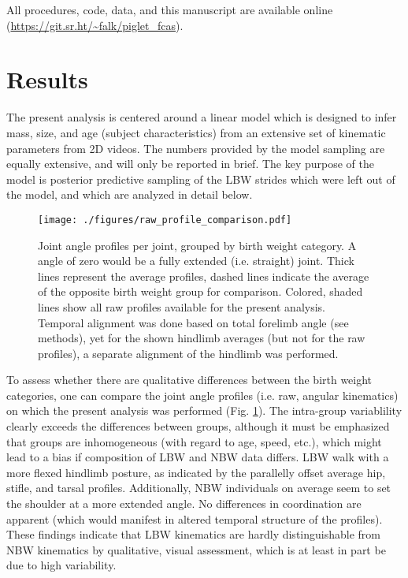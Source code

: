 All procedures, code, data, and this manuscript are available online (\url{https://git.sr.ht/\~falk/piglet\_fcas}).

\FloatBarrier
\clearpage
\section{Results}
\label{results_22}
The present analysis is centered around a linear model which is designed to infer mass, size, and age (subject characteristics) from an extensive set of kinematic parameters from 2D videos.
The numbers provided by the model sampling are equally extensive, and will only be reported in brief.
The key purpose of the model is posterior predictive sampling of the LBW strides which were left out of the model, and which are analyzed in detail below.


\bigskip

\begin{figure}[p]
\centering
\texttt{[image: ./figures/raw\_profile\_comparison.pdf]}
\caption{\label{fig:raw_data}Joint angle profiles per joint, grouped by birth weight category. A  angle of zero would be a fully extended (i.e. straight) joint. Thick lines represent the average profiles, dashed lines indicate the average of the opposite birth weight group for comparison. Colored, shaded lines show all raw profiles available for the present analysis. Temporal alignment was done based on total forelimb angle (see methods), yet for the shown hindlimb averages (but not for the raw profiles), a separate alignment of the hindlimb was performed.}
\end{figure}

To assess whether there are qualitative differences between the birth weight categories, one can compare the joint angle profiles (i.e. raw, angular kinematics) on which the present analysis was performed (Fig. \ref{fig:raw_data}).
The intra-group variablility clearly exceeds the differences between groups, although it must be emphasized that groups are inhomogeneous (with regard to age, speed, etc.), which might lead to a bias if composition of LBW and NBW data differs.
LBW walk with a more flexed hindlimb posture, as indicated by the parallelly offset average hip, stifle, and tarsal profiles.
Additionally, NBW individuals on average seem to set the shoulder at a more extended  angle.
No differences in coordination are apparent (which would manifest in altered temporal structure of the profiles).
These findings indicate that LBW kinematics are hardly distinguishable from NBW kinematics by qualitative, visual assessment, which is at least in part be due to high variability.



